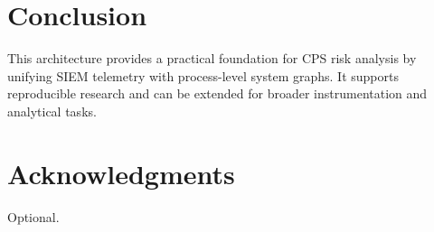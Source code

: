 \documentclass[journal]{IEEEtran}
\begin{document}
\section{Conclusion}
This architecture provides a practical foundation for CPS risk analysis by unifying
SIEM telemetry with process-level system graphs. It supports reproducible research and
can be extended for broader instrumentation and analytical tasks.

\section*{Acknowledgments}
Optional.



\end{document}
